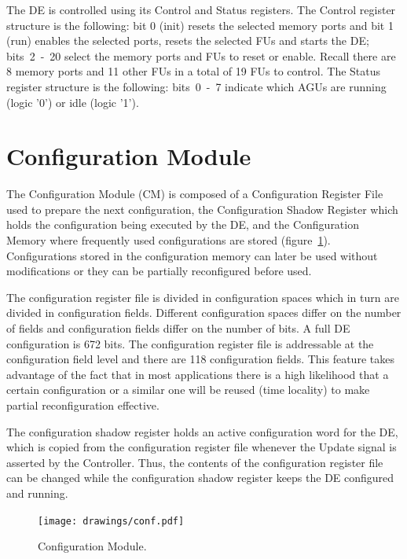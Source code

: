 The DE is controlled using its Control and Status registers. The
Control register structure is the following: bit 0 (init) resets the
selected memory ports and bit 1 (run) enables the selected ports,
resets the selected FUs and starts the DE; bits~2~-~20 select the
memory ports and FUs to reset or enable. Recall there are 8 memory
ports and 11 other FUs in a total of 19 FUs to control. The Status
register structure is the following: bits~0~-~7 indicate which AGUs
are running (logic '0') or idle (logic '1').

\section{Configuration Module}
\label{section:configuration}

The Configuration Module (CM) is composed of a Configuration Register
File used to prepare the next configuration, the Configuration Shadow
Register which holds the configuration being executed by the DE, and
the Configuration Memory where frequently used configurations are
stored (figure~\ref{fig_conf}). Configurations stored in the
configuration memory can later be used without modifications or they
can be partially reconfigured before used.

The configuration register file is divided in configuration spaces
which in turn are divided in configuration fields. Different
configuration spaces differ on the number of fields and configuration
fields differ on the number of bits. A full DE configuration is 672
bits. The configuration register file is addressable at the
configuration field level and there are 118 configuration fields. This
feature takes advantage of the fact that in most applications there is
a high likelihood that a certain configuration or a similar one will
be reused (time locality) to make partial reconfiguration effective.

The configuration shadow register holds an active configuration word
for the DE, which is copied from the configuration register file
whenever the Update signal is asserted by the Controller. Thus, the
contents of the configuration register file can be changed while the
configuration shadow register keeps the DE configured and running.

\begin{figure}[!htb]
\centering \texttt{[image: drawings/conf.pdf]}
\caption{Configuration Module.}
\label{fig_conf}
\end{figure}

